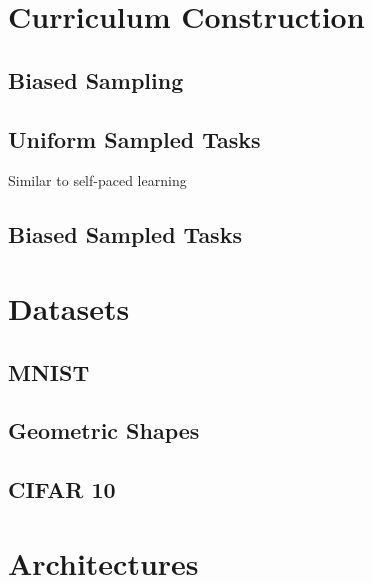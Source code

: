 \section{Curriculum Construction}

\subsection{Biased Sampling}

\subsection{Uniform Sampled Tasks}
Similar to self-paced learning
\subsection{Biased Sampled Tasks}


\section{Datasets}

\subsection{MNIST}

\subsection{Geometric Shapes}

\subsection{CIFAR 10}

\section{Architectures}